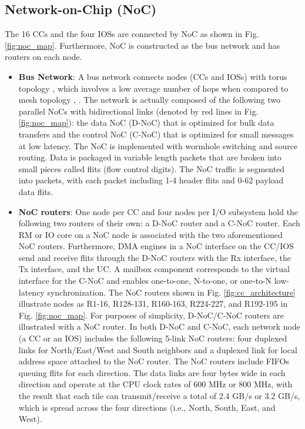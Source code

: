 \subsection{Network-on-Chip (NoC)}
\label{sec:noc}
The 16 CCs and the four IOSs are connected by NoC as shown in Fig. \ref{fig:noc_map}.
Furthermore, NoC is constructed  as the bus network and has routers on each node.

\begin{itemize}
  \setlength{\leftskip}{-5mm}
  \item \textbf{Bus Network}:
  A bus network connects nodes (CCs and IOSs) with torus topology \cite{dally2001route}, which  involves a low average number of hops when compared to mesh topology \cite{vangal200780}, \cite{taylor2002raw}.
  The network is actually composed of the following two parallel NoCs with bidirectional links (denoted by red lines in Fig. \ref{fig:noc_map}):
  the data NoC (D-NoC) that is optimized for bulk data transfers and the control NoC (C-NoC) that is optimized for small messages at low latency.
  The NoC is implemented with wormhole switching and source routing.
  Data is packaged in variable length packets that are broken into small pieces called flits (flow control digits).
  The NoC traffic is segmented into packets, with each packet including 1-4 header flits and 0-62 payload data flits.
  
  \item \textbf{NoC routers}:
  One node per CC and four nodes per I/O subsystem hold the following two routers of their own: a D-NoC router and a C-NoC router.
  Each RM or IO core on a NoC node is associated with the two aforementioned  NoC routers.
  Furthermore, DMA engines in a NoC interface on the CC/IOS send and receive flits through the D-NoC routers with the Rx interface, the Tx interface, and the UC.
  A mailbox component corresponds to the virtual interface for the C-NoC and enables one-to-one, N-to-one, or one-to-N low-latency synchronization.
  The NoC routers shown in Fig. \ref{fig:cc_architecture} illustrate nodes as R1-16, R128-131, R160-163, R224-227, and R192-195 in Fig. \ref{fig:noc_map}.
  For purposes of simplicity, D-NoC/C-NoC routers are illustrated with a NoC router.
  In both D-NoC and C-NoC, each network node (a CC or an IOS)  includes the following 5-link NoC routers:
  four duplexed links for North/East/West and South neighbors and a duplexed link for local address space attached to the NoC router.
  The NoC routers include FIFOs queuing flits for each direction.
  The data links are four bytes wide in each direction and operate at the CPU clock rates of 600 MHz or 800 MHz, with the result that each tile can transmit/receive a total of 2.4 GB/s or 3.2 GB/s, which is spread across the four directions (i.e., North, South, East, and West).
\end{itemize}  

